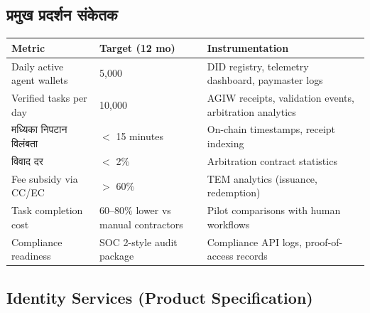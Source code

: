 \documentclass[11pt]{article}
\begin{document}
\subsection{प्रमुख प्रदर्शन संकेतक}
\begin{longtable}{@{}p{}p{}p{}@{}}
\toprule
\textbf{Metric} & \textbf{Target (12 mo)} & \textbf{Instrumentation} \\\midrule
Daily active agent wallets & 5,000 & DID registry, telemetry dashboard, paymaster logs \\
Verified tasks per day & 10,000 & AGIW receipts, validation events, arbitration analytics \\
मध्यिका निपटान विलंबता & $<$ 15 minutes & On-chain timestamps, receipt indexing \\
विवाद दर & $<$ 2\% & Arbitration contract statistics \\
Fee subsidy via CC/EC & $>$ 60\% & TEM analytics (issuance, redemption) \\
Task completion cost & 60--80\% lower vs manual contractors & Pilot comparisons with human workflows \\
Compliance readiness & SOC 2-style audit package & Compliance API logs, proof-of-access records \\
\bottomrule
\end{longtable}

\subsection{Identity Services (Product Specification)}
\label{sec:identity-spec}
\end{document}
